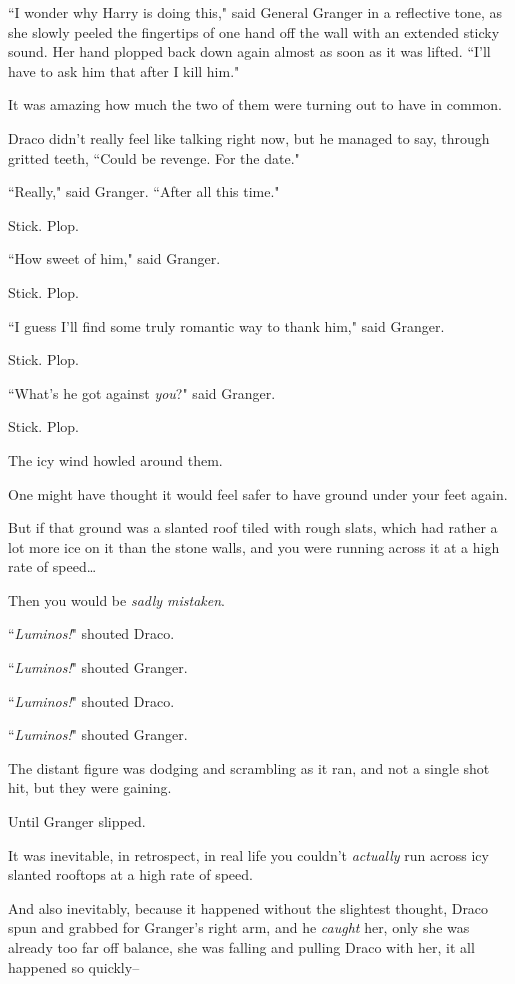 ``I wonder why Harry is doing this," said General Granger in a reflective tone, as she slowly peeled the fingertips of one hand off the wall with an extended sticky sound. Her hand plopped back down again almost as soon as it was lifted. ``I'll have to ask him that after I kill him."

It was amazing how much the two of them were turning out to have in common.

Draco didn't really feel like talking right now, but he managed to say, through gritted teeth, ``Could be revenge. For the date."

``Really," said Granger. ``After all this time."

Stick. Plop.

``How sweet of him," said Granger.

Stick. Plop.

``I guess I'll find some truly romantic way to thank him," said Granger.

Stick. Plop.

``What's he got against \emph{you}?" said Granger.

Stick. Plop.

The icy wind howled around them.

\later

One might have thought it would feel safer to have ground under your feet again.

But if that ground was a slanted roof tiled with rough slats, which had rather a lot more ice on it than the stone walls, and you were running across it at a high rate of speed{\ldots}

Then you would be \emph{sadly mistaken}.

``\emph{Luminos!}" shouted Draco.

``\emph{Luminos!}" shouted Granger.

``\emph{Luminos!}" shouted Draco.

``\emph{Luminos!}" shouted Granger.

The distant figure was dodging and scrambling as it ran, and not a single shot hit, but they were gaining.

Until Granger slipped.

It was inevitable, in retrospect, in real life you couldn't \emph{actually} run across icy slanted rooftops at a high rate of speed.

And also inevitably, because it happened without the slightest thought, Draco spun and grabbed for Granger's right arm, and he \emph{caught} her, only she was already too far off balance, she was falling and pulling Draco with her, it all happened so quickly\---

